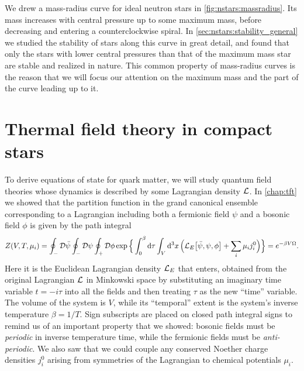 We drew a mass-radius curve for ideal neutron stars in \cref{fig:nstars:massradius}.
Its mass increases with central pressure up to some maximum mass, before decreasing and entering a counterclockwise spiral.
In \cref{sec:nstars:stability_general} we studied the stability of stars along this curve in great detail,
and found that only the stars with lower central pressures than that of the maximum mass star are stable and realized in nature.
This common property of mass-radius curves is the reason that we will focus our attention on the maximum mass and the part of the curve leading up to it.

\section{Thermal field theory in compact stars}
\label{sec:master_intro:tft}

To derive equations of state for quark matter, we will study quantum field theories whose dynamics is described by some Lagrangian density $\mathcal{L}$.
In \cref{chap:tft} we showed that the partition function in the grand canonical ensemble corresponding to a Lagrangian including both a fermionic field $\psi$ and a bosonic field $\phi$ is given by the path integral
\begin{equation}
	Z(V, T, \mu_i) = \oint_- \mathcal{D} \bar{\psi} \oint_- \mathcal{D} \psi \oint_+ \mathcal{D} \phi \exp \Big\{ \int_0^\beta \mathop{}\!\mathrm{d} \tau \int_V \mathop{}\!\mathrm{d}^3 x \, \Big( \mathcal{L}_E\big[\bar{\psi}, \psi, \phi\big] + \sum_i \mu_i j^0_i \Big) \Big\} = e^{-\beta V \Omega} .
\label{eq:master_intro:partition_function}
\end{equation}
Here it is the Euclidean Lagrangian density $\mathcal{L}_E$ that enters,
obtained from the original Lagrangian $\mathcal{L}$ in Minkowski space by substituting an imaginary time variable $t = -i \tau$ into all the fields and then treating $\tau$ as the new ``time'' variable.
The volume of the system is $V$, while its ``temporal'' extent is the system's inverse temperature $\beta = 1/T$.
Sign subscripts are placed on closed path integral signs to remind us of an important property that we showed: bosonic fields must be \emph{periodic} in inverse temperature time, while the fermionic fields must be \emph{anti-periodic}.
We also saw that we could couple any conserved Noether charge densities $j^0_i$ arising from symmetries of the Lagrangian to chemical potentials $\mu_i$.


